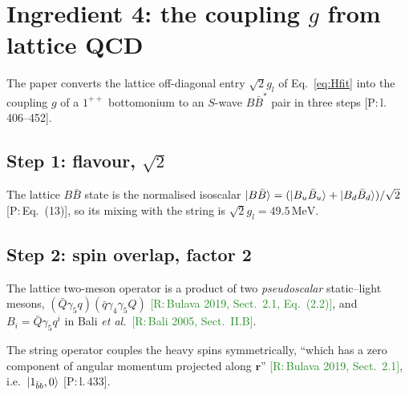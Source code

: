 \documentclass[11pt,a4paper]{article}
\newcommand{\tagP}[1]{\textcolor{blue!65!black}{\textsf{\small[P:\,#1]}}}
\newcommand{\tagR}[1]{\textcolor{ForestGreen}{\textsf{\small[R:\,#1]}}}
\newcommand{\BBst}{B\bar B^*}
\renewcommand{\MeV}{\,\mathrm{MeV}}
\begin{document}
\section{Ingredient 4: the coupling $g$ from lattice QCD}
\label{sec:g}

The paper converts the lattice off-diagonal entry $\sqrt2g_l$ of Eq.~\eqref{eq:Hfit} into the coupling $g$ of a $1^{++}$ bottomonium to an $S$-wave $\BBst$ pair in three steps \tagP{l.\,406--452}.

\subsection{Step 1: flavour, $\sqrt2$}
The lattice $B\bar B$ state is the normalised isoscalar $\ket{B\bar B}=(\ket{B_u\bar B_u}+\ket{B_d\bar B_d})/\sqrt2$ \tagP{Eq.~(13)}, so its mixing with the string is $\sqrt2g_l=49.5\MeV$.

\subsection{Step 2: spin overlap, factor 2}

The lattice two-meson operator is a product of two \emph{pseudoscalar} static--light mesons, $(\bar Q\gamma_5q)(\bar q\gamma_4\gamma_5Q)$ \tagR{Bulava 2019, Sect.~2.1, Eq.~(2.2)}, and $B_i=\bar Q\gamma_5q^i$ in Bali \emph{et al.}\ \tagR{Bali 2005, Sect.~II.B}.

The string operator couples the heavy spins symmetrically, ``which has a zero component of angular momentum projected along $\bm r$'' \tagR{Bulava 2019, Sect.~2.1}, i.e.\ $\ket{1_{\bar bb},0}$ \tagP{l.\,433}.
\end{document}
